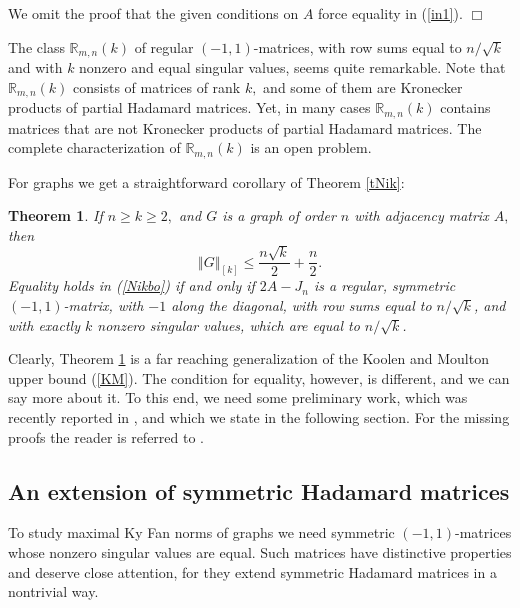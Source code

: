 \documentclass[12pt]{article}%
\newtheorem{theorem}{Theorem}[section]
\newenvironment{proof}[1][Proof]{\noindent{\textbf {#1}  }}  {\hfill$\Box$\bigskip}
\begin{document}
\begin{proof}
We omit the proof that the given conditions on $A$ force equality in
(\ref{in1}).
\end{proof}

The class $\mathbb{R}_{m,n}\left(  k\right)  $ of regular $\left(
-1,1\right)  $-matrices, with row sums equal to $n/\sqrt{k}$ and with $k$
nonzero and equal singular values, seems quite remarkable. Note that
$\mathbb{R}_{m,n}\left(  k\right)  $ consists of matrices of rank $k,$ and
some of them are Kronecker products of partial Hadamard matrices. Yet, in many
cases $\mathbb{R}_{m,n}\left(  k\right)  $ contains matrices that are not
Kronecker products of partial Hadamard matrices. The complete characterization
of $\mathbb{R}_{m,n}\left(  k\right)  $ is an open problem.\medskip

For graphs we get a straightforward corollary of Theorem \ref{tNik}:

\begin{theorem}
\label{thKF}If $n\geq k\geq2,$ and $G$ is a graph of order $n$ with adjacency
matrix $A,$ then
\begin{equation}
\left\Vert G\right\Vert _{\left[  k\right]  }\leq\frac{n\sqrt{k}}{2}+\frac
{n}{2}. \label{Nikbo}%
\end{equation}
Equality holds in (\ref{Nikbo}) if and only if $2A-J_{n}$ is a regular,
symmetric $\left(  -1,1\right)  $-matrix, with $-1$ along the diagonal, with
row sums equal to $n/\sqrt{k}$, and with exactly $k$ nonzero singular values,
which are equal to $n/\sqrt{k}$.
\end{theorem}

Clearly, Theorem \ref{thKF} is a far reaching generalization of the Koolen and
Moulton upper bound (\ref{KM}). The condition for equality, however, is
different, and we can say more about it. To this end, we need some preliminary
work, which was recently reported in \cite{Nik15b}, and which we state in the
following section. For the missing proofs the reader is referred to
\cite{Nik15b}.

\subsection{\label{sec eH}An extension of symmetric Hadamard matrices}

To study maximal Ky Fan norms of graphs we need symmetric $\left(
-1,1\right)  $-matrices whose nonzero singular values are equal. Such matrices
have distinctive properties and deserve close attention, for they extend
symmetric Hadamard matrices in a nontrivial way.\medskip
\end{document}
